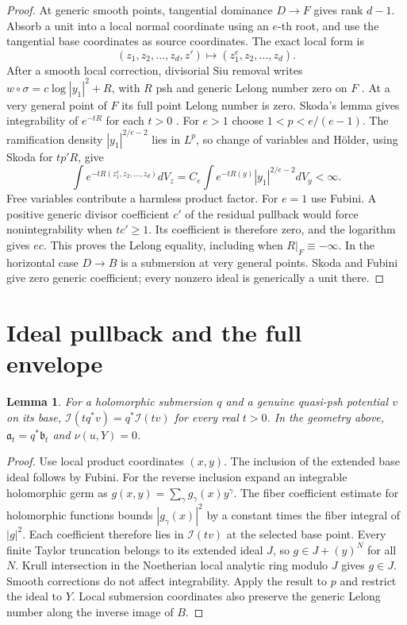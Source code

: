 \documentclass[11pt]{article}
\newcommand{\I}{\mathcal I}
\newtheorem{lemma}[theorem]{Lemma}
\theoremstyle{remark}\newtheorem{remark}[theorem]{Remark}
\begin{document}
\begin{proof}
At generic smooth points, tangential dominance $D\to F$ gives
rank $d-1$. Absorb a unit into a local normal coordinate using
an $e$-th root, and use the tangential base coordinates as source
coordinates. The exact local form is
\[
 (z_1,z_2,\ldots,z_d,z')\longmapsto(z_1^e,z_2,\ldots,z_d).
\]
After a smooth local correction, divisorial Siu removal writes
$w\circ\sigma=c\log|y_1|^2+R$, with $R$ psh and generic
Lelong number zero on $F$
\cite[Chapter III, (8.15)--(8.16)]{Dem}.
At a very general point of $F$ its full point Lelong number is zero.
Skoda's lemma gives integrability of $e^{-tR}$ for each $t>0$
\cite[Lemma 5.6(a)]{DemAM}.
For $e>1$ choose $1<p<e/(e-1)$. The ramification density
$|y_1|^{2/e-2}$ lies in $L^p$, so change of variables and
H\"older, using Skoda for $tp'R$, give
\[
 \int e^{-tR(z_1^e,z_2,\ldots,z_d)}dV_z
 =C_e\int e^{-tR(y)}|y_1|^{2/e-2}dV_y<\infty.
\]
Free variables contribute a harmless product factor. For $e=1$
use Fubini. A positive generic divisor coefficient $c'$ of the
residual pullback would force nonintegrability when $tc'\ge1$.
Its coefficient is therefore zero, and the logarithm gives $ec$.
This proves the Lelong equality, including when $R|_F\equiv-\infty$.
In the horizontal case $D\to B$ is a submersion at very general
points. Skoda and Fubini give zero generic coefficient; every
nonzero ideal is generically a unit there.
\end{proof}

\section{Ideal pullback and the full envelope}
\begin{lemma}\label{lem:ideals}
For a holomorphic submersion $q$ and a genuine quasi-psh potential
$v$ on its base, $\I(tq^*v)=q^*\I(tv)$ for every real $t>0$.
In the geometry above, $\mathfrak a_t=q^*\mathfrak b_t$ and
$\nu(u,Y)=0$.
\end{lemma}
\begin{proof}
Use local product coordinates $(x,y)$. The inclusion of the extended
base ideal follows by Fubini. For the reverse inclusion expand an
integrable holomorphic germ as $g(x,y)=\sum_\gamma g_\gamma(x)y^\gamma$.
The fiber coefficient estimate for holomorphic functions bounds
$|g_\gamma(x)|^2$ by a constant times the fiber integral of $|g|^2$.
Each coefficient therefore lies in $\I(tv)$ at the selected base point.
Every finite Taylor truncation belongs to its extended ideal $J$,
so $g\in J+(y)^N$ for all $N$. Krull intersection in the Noetherian
local analytic ring modulo $J$ gives $g\in J$. Smooth corrections
do not affect integrability. Apply the result to $p$ and restrict
the ideal to $Y$. Local submersion coordinates also preserve the
generic Lelong number along the inverse image of $B$.
\end{proof}
\end{document}
